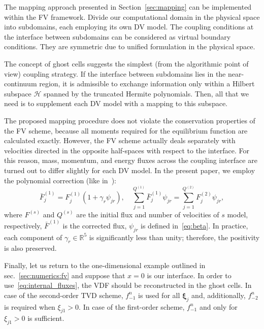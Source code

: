 \documentclass[]{elsarticle} %
\newcommand{\bxi}{\boldsymbol{\xi}}
\newcommand{\bxia}{\bxi_j}
\begin{document}
{The mapping approach presented in Section~\ref{sec:mapping} can be implemented within the FV framework.
Divide our computational domain in the physical space into subdomains, each employing its own DV model.
The coupling conditions at the interface between subdomains can be considered as virtual boundary conditions.
They are symmetric due to unified formulation in the physical space.

The concept of ghost cells suggests the simplest (from the algorithmic point of view) coupling strategy.
If the interface between subdomains lies in the near-continuum region,
it is admissible to exchange information only within a Hilbert subspace \(\mathcal{H}\)
spanned by the truncated Hermite polynomials.
Then, all that we need is to supplement each DV model with a mapping to this subspace.

The proposed mapping procedure does not violate the conservation properties of the FV scheme,
because all moments required for the equilibrium function are calculated exactly.
However, the FV scheme actually deals separately with velocities
directed in the opposite half-spaces with respect to the interface.
For this reason, mass, momentum, and energy fluxes across the coupling interface
are turned out to differ slightly for each DV model.
In the present paper, we employ the polynomial correction (like in~\cite{Aristov1980}):
\begin{equation}\label{eq:poly_correction}
    \bar{F}^{(1)}_j = F^{(1)}_j(1+\gamma_r\psi_{j r}), \quad
    \sum_{j=1}^{Q^{(1)}} \bar{F}^{(1)}_j\psi_{j r} = \sum_{j=1}^{Q^{(2)}} F^{(2)}_j\psi_{j r},
\end{equation}
where \(F^{(s)}\) and \(Q^{(s)}\) are the initial flux and number of velocities of \(s\) model, respectively,
\(\bar{F}^{(1)}\) is the corrected flux, \(\psi_{j r}\) is defined in~\eqref{eq:beta}.
In practice, each component of \(\gamma_r\in\mathbb{R}^5\) is significantly less than unity;
therefore, the positivity is also preserved.

Finally, let us return to the one-dimensional example outlined in sec.~\ref{sec:numerics:fv}
and suppose that \(x=0\) is our interface.
In order to use~\eqref{eq:internal_fluxes}, the VDF should be reconstructed in the ghost cells.
In case of the second-order TVD scheme, \(f_{-1}^n\) is used for all \(\bxia\) and, additionally,
\(f_{-2}^n\) is required when \(\xi_{j1}>0\).
In case of the first-order scheme, \(f_{-1}^n\) and only for \(\xi_{j1}>0\) is sufficient.

}
\end{document}
